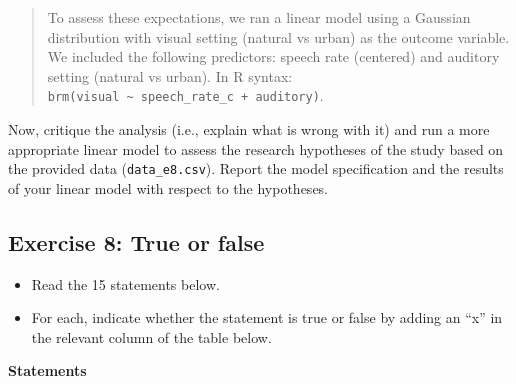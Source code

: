 \documentclass[
]{article}
\providecommand{\tightlist}{%
  \setlength{\itemsep}{0pt}\setlength{\parskip}{0pt}}
\begin{document}
\begin{quote}
To assess these expectations, we ran a linear model using a Gaussian
distribution with visual setting (natural vs urban) as the outcome
variable. We included the following predictors: speech rate (centered)
and auditory setting (natural vs urban). In R syntax:
\texttt{brm(visual\ \textasciitilde{}\ speech\_rate\_c\ +\ auditory)}.
\end{quote}

Now, critique the analysis (i.e., explain what is wrong with it) and run
a more appropriate linear model to assess the research hypotheses of the
study based on the provided data (\texttt{data\_e8.csv}). Report the
model specification and the results of your linear model with respect to
the hypotheses.

\hypertarget{exercise-8-true-or-false}{%
\subsection{Exercise 8: True or false}\label{exercise-8-true-or-false}}

\begin{itemize}
\tightlist
\item
  Read the 15 statements below.
\item
  For each, indicate whether the statement is true or false by adding an
  ``x'' in the relevant column of the table below.
\end{itemize}

\textbf{Statements}
\end{document}
